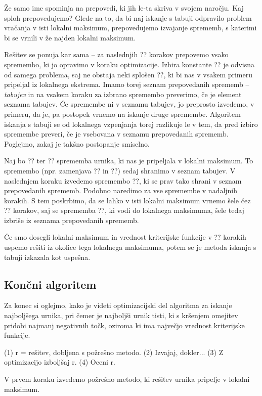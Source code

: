 \documentclass[a4paper,10pt]{article}
\begin{document}
Že samo ime spominja na prepovedi, ki jih le-ta skriva v svojem naročju. Kaj sploh prepovedujemo?
Glede na to, da bi naj iskanje s tabuji odpravilo problem vračanja v isti lokalni maksimum,
prepovedujemo izvajanje sprememb, s katerimi bi se vrnili v že najden lokalni maksimum.

Rešitev se ponuja kar sama -- za naslednjih ?? korakov prepovemo vsako spremembo, ki jo
opravimo v koraku optimizacije. Izbira konstante ?? je odvisna od samega problema, saj
ne obstaja neki splošen ??, ki bi nas v vsakem primeru pripeljal iz lokalnega ekstrema.
Imamo torej seznam prepovedanih sprememb -- \emph{tabujev} in na vsakem koraku za izbrano
spremembo preverimo, če je element seznama tabujev. Če spremembe ni v seznamu tabujev, jo
preprosto izvedemo, v primeru, da je, pa postopek vrnemo na iskanje druge spremembe.
Algoritem iskanja s tabuji se od lokalnega vzpenjanja torej razlikuje le v tem, da pred
izbiro spremembe preveri, če je vsebovana v seznamu prepovedanih sprememb. Poglejmo, zakaj
je takšno postopanje smiselno.

Naj bo ?? ter ?? sprememba urnika, ki nas je pripeljala v lokalni maksimum. To
spremembo (npr. zamenjava ?? in ??) sedaj shranimo v
seznam tabujev. V naslednjem koraku izvedemo spremembo ??, ki se prav tako shrani v
seznam prepovedanih sprememb. Podobno naredimo za vse spremembe v nadaljnih korakih. S
tem poskrbimo, da se lahko v isti lokalni maksimum vrnemo šele čez ?? korakov, saj
se sprememba ??, ki vodi do lokalnega maksimuma, šele tedaj izbriše iz seznama
prepovedanih sprememb.

Če smo dosegli lokalni maksimum in vrednost kriterijske funkcije v ?? korakih uspemo
rešiti iz okolice tega lokalnega maksimuma, potem se je metoda iskanja s tabuji izkazala
kot uspešna.

\subsection{Končni algoritem}

Za konec si oglejmo, kako je videti optimizacijski del algoritma za iskanje najboljšega
urnika, pri čemer je najboljši urnik tisti, ki s kršenjem omejitev pridobi najmanj negativnih
točk, oziroma ki ima največjo vrednost kriterijske funkcije.

(1) r = rešitev, dobljena s požrešno metodo.
(2) Izvajaj, dokler...
{
   (3) Z optimizacijo izboljšaj r.
   (4) Oceni r.
}

   V prvem koraku izvedemo požrešno metodo, ki rešitev urnika pripelje v lokalni maksimum.
\end{document}
